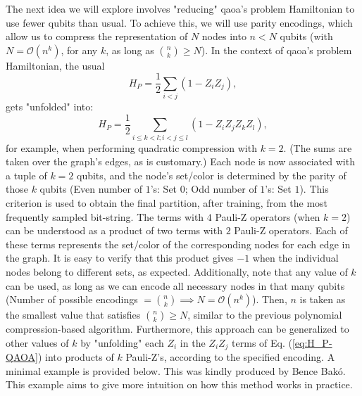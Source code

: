 The next idea we will explore involves "reducing" \acrshort{qaoa}'s problem Hamiltonian to use fewer qubits than usual. To achieve this, we will use parity encodings, which allow us to compress the representation of \(N\) nodes into \(n < N\) qubits (with \(N = \mathcal{O}(n^k)\), for any \(k\), as long as \(\binom{n}{k} \geq N\)). In the context of \acrshort{qaoa}'s problem Hamiltonian, the usual
\begin{equation}\label{eq:H_P-QAOA}
    H_P = \frac{1}{2}\sum\limits_{i<j}(1-Z_iZ_j),
\end{equation}
gets "unfolded" into:
\begin{equation}\label{eq:H_P-QAOA-k=2}
    H_P = \frac{1}{2}\sum\limits_{i \leq k<l;i<j \leq l}(1-Z_iZ_jZ_kZ_l),
\end{equation}
for example, when performing quadratic compression with \(k = 2\). (The sums are taken over the graph's edges, as is customary.) Each node is now associated with a tuple of \(k = 2\) qubits, and the node's set/color is determined by the parity of those \(k\) qubits (Even number of $1$'s: Set $0$; Odd number of $1$'s: Set $1$). This criterion is used to obtain the final partition, after training, from the most frequently sampled bit-string. The terms with $4$ Pauli-Z operators (when \(k = 2\)) can be understood as a product of two terms with $2$ Pauli-Z operators. Each of these terms represents the set/color of the corresponding nodes for each edge in the graph. It is easy to verify that this product gives $-1$ when the individual nodes belong to different sets, as expected. Additionally, note that any value of \(k\) can be used, as long as we can encode all necessary nodes in that many qubits (Number of possible encodings \(= \binom{n}{k} \implies N = \mathcal{O}(n^k)\)). Then, \(n\) is taken as the smallest value that satisfies \(\binom{n}{k} \geq N\), similar to the previous polynomial compression-based algorithm. Furthermore, this approach can be generalized to other values of \(k\) by "unfolding" each \(Z_i\) in the \(Z_i Z_j\) terms of Eq. (\ref{eq:H_P-QAOA}) into products of \(k\) Pauli-Z's, according to the specified encoding. A minimal example is provided below. This was kindly produced by Bence Bakó. This example aims to give more intuition on how this method works in practice.

